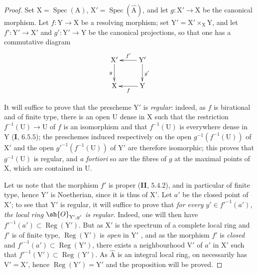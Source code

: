 \begin{proof}
Set $\mathrm{X}=\operatorname{Spec}(\mathrm{A})$, $\mathrm{X}'=\operatorname{Spec}(\widehat{\mathrm{A}})$, and let $g:\mathrm{X}'\to\mathrm{X}$ be the canonical morphism. Let $f:\mathrm{Y}\to\mathrm{X}$ be a resolving morphism; set $\mathrm{Y}'=\mathrm{X}'\times_\mathrm{X}\mathrm{Y}$, and let $f':\mathrm{Y}'\to\mathrm{X}'$ and $g':\mathrm{Y}'\to\mathrm{Y}$ be the canonical projections, so that one has a commutative diagram
\[
  \xymatrix{
    \mathrm{X}' \ar[d]_g & \mathrm{Y}' \ar[l]_{f'} \ar[d]^{g'} \\
    \mathrm{X} & \mathrm{Y} \ar[l]^f
  }
\]

It will suffice to prove that the prescheme $\mathrm{Y}'$ is \emph{regular}: indeed, as $f$ is birational and of finite type, there is an open $\mathrm{U}$ dense in $\mathrm{X}$ such that the restriction $f^{-1}(\mathrm{U})\to\mathrm{U}$ of $f$ is an isomorphism and that $f^{-1}(\mathrm{U})$ is everywhere dense in $\mathrm{Y}$ (\textbf{I}, $6.5.5$); the preschemes induced respectively on the open $g^{-1}(f^{-1}(\mathrm{U}))$ of $\mathrm{X}'$ and the open $g'^{-1}(f^{-1}(\mathrm{U}))$ of $\mathrm{Y}'$ are therefore isomorphic; this proves that $g^{-1}(\mathrm{U})$ is regular, and \emph{a fortiori} so are the fibres of $g$ at the maximal points of $\mathrm{X}$, which are contained in $\mathrm{U}$.


Let us note that the morphism $f'$ is proper (\textbf{II}, $5.4.2$), and in particular of finite type, hence $\mathrm{Y}'$ is Noetherian, since it is thus of $\mathrm{X}'$. Let $a'$ be the closed point of $\mathrm{X}'$; to see that $\mathrm{Y}'$ is regular, it will suffice to prove that \emph{for every} $y'\in f'^{-1}(a')$, \emph{the local ring} $\sh{O}_{\mathrm{Y}',y'}$ \emph{is regular}. Indeed, one will then have $f'^{-1}(a')\subset\operatorname{Reg}(\mathrm{Y}')$. But as $\mathrm{X}'$ is the spectrum of a complete local ring and $f'$ is of finite type, $\operatorname{Reg}(\mathrm{Y}')$ is \emph{open} in $\mathrm{Y}'$ , and as the morphism $f'$ is \emph{closed} and $f'^{-1}(a')\subset\operatorname{Reg}(\mathrm{Y}')$, there exists a neighbourhood $\mathrm{V}'$ of $a'$ in $\mathrm{X}'$ such that $f'^{-1}(\mathrm{V}')\subset\operatorname{Reg}(\mathrm{Y}')$. As $\widehat{\mathrm{A}}$ is an integral local ring, on necessarily has $\mathrm{V}'=\mathrm{X}'$, hence $\operatorname{Reg}(\mathrm{Y}')=\mathrm{Y}'$ and the proposition will be proved.


\end{proof}
